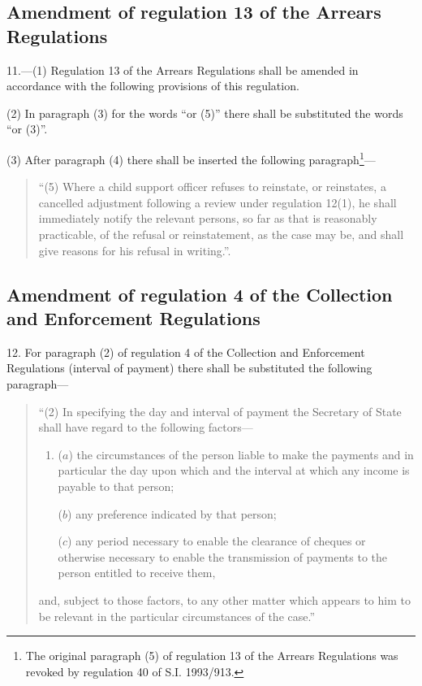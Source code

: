 \documentclass[12pt,a4paper]{article}
\begin{document}
\subsection[11. Amendment of regulation 13 of the Arrears Regulations]{Amendment of regulation 13 of the Arrears Regulations}

11.—(1) Regulation 13 of the Arrears Regulations shall be amended in accordance with the following provisions of this regulation.

(2) In paragraph (3) for the words “or (5)” there shall be substituted the words “or (3)”.

(3) After paragraph (4) there shall be inserted the following paragraph\footnote{\frenchspacing The original paragraph (5) of regulation 13 of the Arrears Regulations was revoked by regulation 40 of S.I. 1993/913.}—
\begin{quotation}
“(5) Where a child support officer refuses to reinstate, or reinstates, a cancelled adjustment following a review under regulation 12(1), he shall immediately notify the relevant persons, so far as that is reasonably practicable, of the refusal or reinstatement, as the case may be, and shall give reasons for his refusal in writing.”.
\end{quotation}

\subsection[12. Amendment of regulation 4 of the Collection and Enforcement Regulations]{Amendment of regulation 4 of the Collection and Enforcement Regulations}

12.  For paragraph (2) of regulation 4 of the Collection and Enforcement Regulations (interval of payment) there shall be substituted the following paragraph—
\begin{quotation}
“(2) In specifying the day and interval of payment the Secretary of State shall have regard to the following factors—
\begin{enumerate}\item[]
($a$) the circumstances of the person liable to make the payments and in particular the day upon which and the interval at which any income is payable to that person;

($b$) any preference indicated by that person;

($c$) any period necessary to enable the clearance of cheques or otherwise necessary to enable the transmission of payments to the person entitled to receive them,
\end{enumerate}
and, subject to those factors, to any other matter which appears to him to be relevant in the particular circumstances of the case.''
\end{quotation}
\end{document}
